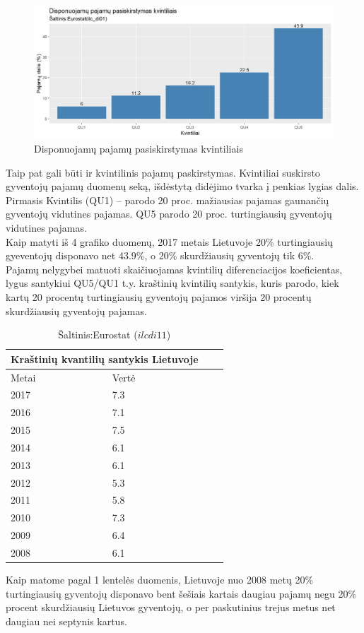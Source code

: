 \documentclass[12pt,a4paper,titlepage]{article}
\begin{document}
\begin{figure}[H]
\includegraphics[scale=0.7]{LTquantiles2017.png}
\caption{Disponuojamų pajamų pasiskirstymas kvintiliais}
\end{figure}
Taip pat gali būti ir kvintilinis pajamų paskirstymas. Kvintiliai suskirsto gyventojų pajamų duomenų seką, išdėstytą didėjimo tvarka į penkias lygias dalis. Pirmasis Kvintilis (QU1) – parodo 20 proc. mažiausias pajamas gaunančių gyventojų vidutines pajamas. QU5 parodo 20 proc. turtingiausių gyventojų vidutines pajamas.\\
Kaip matyti iš 4 grafiko duomenų, 2017 metais Lietuvoje 20\% turtingiausių gyeventojų disponavo net 43.9\%, o 20\% skurdžiausių gyventojų tik 6\%.  \\
Pajamų nelygybei matuoti skaičiuojamas kvintilių diferenciacijos koeficientas, lygus  santykiui QU5/QU1 t.y. kraštinių kvintilių santykis, kuris parodo, kiek kartų 20 procentų turtingiausių gyventojų pajamos viršija 20 procentų skurdžiausių gyventojų pajamas. \\
\begin{table}[h!]
\centering
\begin{center}
 \begin{tabular}{ |p{3cm}||p{3cm}|p{3cm}|p{3cm}|  }
 \hline
 \multicolumn{2}{|c|}{Kraštinių kvantilių santykis Lietuvoje} \\
 \hline
 Metai & Vertė\\
 \hline
2017 & 7.3 \\
2016 & 7.1 \\
2015 & 7.5 \\ 
2014 & 6.1 \\
2013 & 6.1 \\
2012 & 5.3 \\
2011 & 5.8 \\
2010 & 7.3 \\
2009 & 6.4 \\
2008 & 6.1 \\
 \hline
\end{tabular}
\end{center}
\caption{Šaltinis:Eurostat ($ilc di11$)}
\label{table:1}
\end{table}
Kaip matome pagal 1 lentelės duomenis, Lietuvoje nuo 2008 metų 20\% turtingiausių gyventojų disponavo bent šešiais kartais daugiau pajamų negu 20\% procent skurdžiausių Lietuvos gyventojų, o per paskutinius trejus metus  net daugiau nei septynis kartus.
\end{document}
